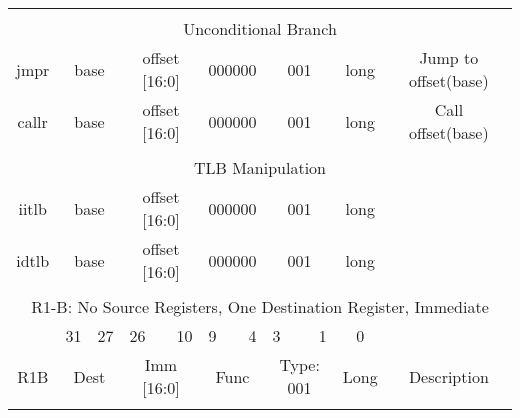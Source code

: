 \documentclass{article}
\begin{document}
\begin{center}
\begin{longtable}{|c|l|r|l|r|l|r|l|r|c|c|}
    
    \hline          \multicolumn{11}{|c|}{} \\
    
                    \multicolumn{11}{|c|}{Unconditional Branch} \\
    \hline jmpr &   \multicolumn{2}{|c|}{base}  &   \multicolumn{2}{|c|}{offset [16:0]} &   \multicolumn{2}{|c|}{000000}    &   \multicolumn{2}{|c|}{001}   &   long    & Jump to offset(base) \\
    \hline callr &  \multicolumn{2}{|c|}{base}  &   \multicolumn{2}{|c|}{offset [16:0]} &   \multicolumn{2}{|c|}{000000}    &   \multicolumn{2}{|c|}{001}   &   long    & Call offset(base) \\
    
        
    \hline          \multicolumn{11}{|c|}{} \\
    
                    \multicolumn{11}{|c|}{TLB Manipulation} \\
    \hline iitlb &  \multicolumn{2}{|c|}{base}  &   \multicolumn{2}{|c|}{offset [16:0]} &   \multicolumn{2}{|c|}{000000}    &   \multicolumn{2}{|c|}{001}   &   long    & \\
    \hline idtlb &  \multicolumn{2}{|c|}{base}  &   \multicolumn{2}{|c|}{offset [16:0]} &   \multicolumn{2}{|c|}{000000}    &   \multicolumn{2}{|c|}{001}   &   long    & \\

    \hline          \multicolumn{11}{c}{} \\
    
    
                    \multicolumn{11}{c}{R1-B: No Source Registers, One Destination Register, Immediate} \\  
    \hline      &   \multicolumn{1}{l}{31}  &   27      &   \multicolumn{1}{l}{26}  &   10      &   \multicolumn{1}{l}{9}   &   4   &   \multicolumn{1}{l}{3}   &   1   &   0       & \\
    \hline R1B  &   \multicolumn{2}{|c|}{Dest}          &   \multicolumn{2}{|c|}{Imm [16:0]}    &   \multicolumn{2}{|c|}{Func}      &   \multicolumn{2}{|c|}{Type: 001} &   Long    &   Description \\
    
    
    \hline          \multicolumn{11}{|c|}{} \\
    

\end{longtable}
\end{center}
\end{document}
